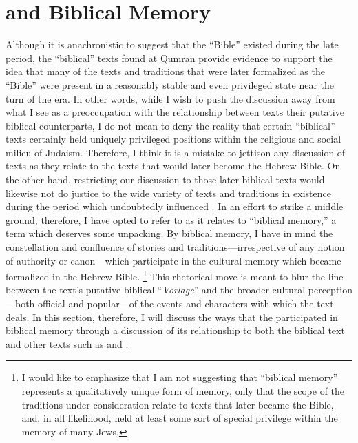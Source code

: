 
\section{\ga and Biblical Memory}

Although it is anachronistic to suggest that the ``Bible''  existed during the late \secondtemple period, the ``biblical'' texts found at Qumran provide evidence to support the idea that many of the texts and traditions that were later formalized as the ``Bible'' were present in a reasonably stable and even privileged state near the turn of the era. In other words, while I wish to push the discussion away from what I see as a preoccupation with the relationship between \rwb texts their putative biblical counterparts, I do not mean to deny the reality that certain ``biblical'' texts certainly held uniquely privileged positions within the religious and social milieu of \secondtemple Judaism. Therefore, I think it is a mistake to jettison any discussion of \rwb texts as they relate to the texts that would later become the Hebrew Bible. On the other hand, restricting our discussion to those later biblical texts would likewise not do justice to the wide variety of texts and traditions in existence during the \secondtemple period which undoubtedly influenced \ga. In an effort to strike a middle ground, therefore, I have opted to refer to \ga as it relates to ``biblical memory,'' a term which deserves some unpacking. By biblical memory, I have in mind the constellation and confluence of stories and traditions---irrespective of any notion of authority or canon---which participate in the cultural memory which became formalized in the Hebrew Bible.%
%
\footnote{I would like to emphasize that I am not suggesting that ``biblical memory'' represents a qualitatively unique form of memory, only that the scope of the traditions under consideration relate to texts that later became the Bible, and, in all likelihood, held at least some sort of special privilege within the memory of many \secondtemple Jews.}
%
This rhetorical move is meant to blur the line between the \rwb text's putative biblical ``\emph{Vorlage}'' and the broader cultural perception---both official and popular---of the events and characters with which the \rwb text deals. In this section, therefore, I will discuss the ways that the \ga participated in biblical memory through a discussion of its relationship to both the biblical text and other \secondtemple texts such as \jub and \firstenoch.

